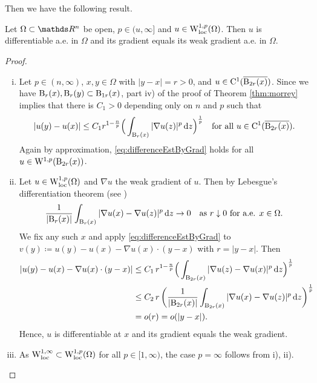 Then we have the following result.

\begin{prop}
Let $\Omega \subset \R^n$ be open, $p \in (u,\infty]$ and $u \in \mathrm{W}_{\operatorname{loc}}^{1,p}(\Omega)$.
Then $u$ is differentiable a.e. in $\Omega$ and its gradient equals its weak gradient a.e. in $\Omega$.
\end{prop}

\begin{proof}
  \begin{enumerate}[i)]
    \item Let $p \in (n,\infty)$, $x,y \in \Omega$ with $|y - x| = r > 0$, and $u \in \mathrm{C}^1(\overline{\mathrm{B}_{2r}(x)})$.
      Since we have $\mathrm{B}_r(x), \mathrm{B}_r(y) \subset \mathrm{B}_{1r}(x)$, part iv) of the proof of Theorem \ref{thm:morrey} implies that there is $C_1 > 0$ depending only on $n$ and $p$ such that
      \begin{equation}
        \label{eq:differenceEstByGrad}
        |u(y) - u(x)|
        \leq C_1 r^{1 - \frac{n}{p}} \Big( \int_{\mathrm{B}_r(x)} |\nabla u(z) |^p \, {\operatorname{d}\!{z}} \Big)^{\frac{1}{p}} \quad\text{for all } u \in \mathrm{C}^1(\overline{\mathrm{B}_{2r}(x)}).
      \end{equation}
      Again by approximation, \ref{eq:differenceEstByGrad} holds for all $u \in \mathrm{W}^{1,p}(\mathrm{B}_{2r}(x))$.

    \item Let $u \in \mathrm{W}_{\operatorname{loc}}^{1,p}(\Omega)$ and $\nabla u$ the weak gradient of $u$.
      Then by Lebesgue's differentiation theorem (see \cite[Section E.4]{evans2010partial})
      $$
      \frac{1}{|\mathrm{B}_r(x)|} \int_{\mathrm{B}_r(x)} |\nabla u(x) - \nabla u(z)|^p \, {\operatorname{d}\!{z}} \to 0 \quad \text{as } r \downarrow 0 \text{ for a.e. } x \in \Omega.
      $$
      We fix any such $x$ and apply \eqref{eq:differenceEstByGrad} to 
      $v(y) \coloneqq u(y) - u(x) - \nabla u(x) \cdot(y - x)$ with $r = |y - x|$.
      Then
      \begin{align*}
        |u(y) - u(x) - \nabla u(x) \cdot (y - x)|
        &\leq C_1 \, r^{1 - \frac{n}{p}} \Big(\int_{\mathrm{B}_{2r}(x)} |\nabla u(z) - \nabla u(x)|^p \, {\operatorname{d}\!{z}} \Big)^{\frac{1}{p}} \\
        &\leq C_2 \, r\, \bigg( \frac{1}{|\mathrm{B}_{2r}(x)|} \int_{\mathrm{B}_{2r}(x)} |\nabla u(x) - \nabla u(z)|^p \, {\operatorname{d}\!{z}} \bigg)^{\frac{1}{p}} \\
        &= o(r) = o(|y - x|).
      \end{align*}
      Hence, $u$ is differentiable at $x$ and its gradient equals the weak gradient.

    \item As $\mathrm{W}_{\operatorname{loc}}^{1,\infty} \subset \mathrm{W}_{\operatorname{loc}}^{1,p}(\Omega)$ for all $p \in [1,\infty)$, the case $p = \infty$ follows from i), ii). \qedhere
  \end{enumerate}
\end{proof}
